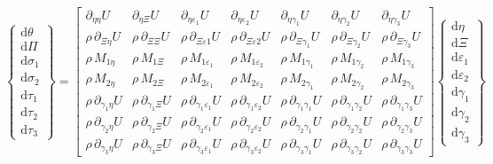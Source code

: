 \begin{equation}
\left\{ \begin{matrix}
\mathrm{d} \theta \\ \mathrm{d} \Pi \\
\mathrm{d} \sigma_1 \\ \mathrm{d} \sigma_2 \\ 
\mathrm{d} \tau_1 \\ \mathrm{d} \tau_2 \\ \mathrm{d} \tau_3
\end{matrix} \right\} = \begin{bmatrix}
\partial_{\eta\eta} U & 
\partial_{\eta\Xi} U & 
\partial_{\eta\varepsilon_1} U & 
\partial_{\eta\varepsilon_2} U &
\partial_{\eta\gamma_1} U &
\partial_{\eta\gamma_2} U &
\partial_{\eta\gamma_3} U \\ 
\rho \, \partial_{\Xi\eta} U & 
\rho \, \partial_{\Xi\Xi} U & 
\rho \, \partial_{\Xi\varepsilon1} U &
\rho \, \partial_{\Xi\varepsilon2} U &
\rho \, \partial_{\Xi\gamma_1} U &
\rho \, \partial_{\Xi\gamma_2} U &
\rho \, \partial_{\Xi\gamma_3} U \\
\rho \, M_{1\eta} & 
\rho \, M_{1\Xi} & 
\rho \, M_{1\varepsilon_1} & 
\rho \, M_{1\varepsilon_2} &
\rho \, M_{1\gamma_1} &
\rho \, M_{1\gamma_2} &
\rho \, M_{1\gamma_3} \\
\rho \, M_{2\eta} & 
\rho \, M_{2\Xi} & 
\rho \, M_{2\varepsilon_1} & 
\rho \, M_{2\varepsilon_2} &
\rho \, M_{2\gamma_1} &
\rho \, M_{2\gamma_2} &
\rho \, M_{2\gamma_3} \\
\rho \, \partial_{\gamma_1\eta} U & 
\rho \, \partial_{\gamma_1\Xi} U & 
\rho \, \partial_{\gamma_1\varepsilon_1} U & 
\rho \, \partial_{\gamma_1\varepsilon_2} U &
\rho \, \partial_{\gamma_1\gamma_1} U  &
\rho \, \partial_{\gamma_1\gamma_2} U &
\rho \, \partial_{\gamma_1\gamma_3} U \\
\rho \, \partial_{\gamma_2\eta} U & 
\rho \, \partial_{\gamma_2\Xi} U & 
\rho \, \partial_{\gamma_2\varepsilon_1} U & 
\rho \, \partial_{\gamma_2\varepsilon_2} U &
\rho \, \partial_{\gamma_2\gamma_1} U  &
\rho \, \partial_{\gamma_2\gamma_2} U &
\rho \, \partial_{\gamma_2\gamma_3} U \\
\rho \, \partial_{\gamma_3\eta} U & 
\rho \, \partial_{\gamma_3\Xi} U & 
\rho \, \partial_{\gamma_3\varepsilon_1} U & 
\rho \, \partial_{\gamma_3\varepsilon_2} U &
\rho \, \partial_{\gamma_3\gamma_1} U  &
\rho \, \partial_{\gamma_3\gamma_2} U &
\rho \, \partial_{\gamma_3\gamma_3} U
\end{bmatrix}
\left\{ \begin{matrix}
\mathrm{d}\eta \\ \mathrm{d} \Xi \\
\mathrm{d} \varepsilon_1 \\ \mathrm{d} \varepsilon_2 \\
\mathrm{d} \gamma_1 \\ \mathrm{d} \gamma_2 \\ \mathrm{d} \gamma_3
\end{matrix} \right\}
\label{energies3D}
\end{equation}
